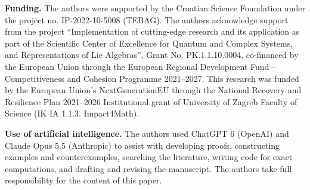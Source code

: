\par\medskip
\noindent\textbf{Funding.} The authors were supported by the Croatian Science Foundation under the project no. IP-2022-10-5008 (TEBAG). The authors acknowledge support from the project ``Implementation of cutting-edge research and its application as part of the Scientific Center of Excellence for Quantum and Complex Systems, and Representations of Lie Algebras'', Grant No. PK.1.1.10.0004, co-financed by the European Union through the European Regional Development Fund -- Competitiveness and Cohesion Programme 2021--2027. This research was funded by the European Union's NextGenerationEU through the National Recovery and Resilience Plan 2021--2026 Institutional grant of University of Zagreb Faculty of Science (IK IA 1.1.3. Impact4Math).

\medskip
\noindent\textbf{Use of artificial intelligence.} The authors used ChatGPT 6 (OpenAI) and Claude Opus 5.5 (Anthropic) to assist with developing proofs, constructing examples and counterexamples, searching the literature, writing code for exact computations, and drafting and revising the manuscript. The authors take full responsibility for the content of this paper.

